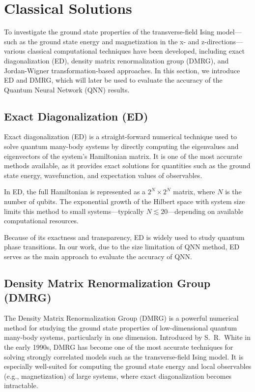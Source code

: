 \documentclass[pre,twocolumn,floatfix]{revtex4-1}
\begin{document}
\section{Classical Solutions}
To investigate the ground state properties of the transverse-field Ising model—such as the ground state energy and magnetization in the x- and z-directions—various classical computational techniques have been developed, including exact diagonalization (ED), density matrix renormalization group (DMRG), and Jordan-Wigner transformation-based approaches. In this section, we introduce ED and DMRG, which will later be used to evaluate the accuracy of the Quantum Neural Network (QNN) results. 
\subsection{Exact Diagonalization (ED)}
Exact diagonalization (ED) is a straight-forward numerical technique used to solve quantum many-body systems by directly computing the eigenvalues and eigenvectors of the system's Hamiltonian matrix. It is one of the most accurate methods available, as it provides exact solutions for quantities such as the ground state energy, wavefunction, and expectation values of observables.

In ED, the full Hamiltonian is represented as a $2^N \times 2^N$ matrix, where $N$ is the number of qubits. The exponential growth of the Hilbert space with system size limits this method to small systems---typically $N \lesssim 20$---depending on available computational resources.

Because of its exactness and transparency, ED is widely used to study quantum phase transitions. In our work, due to the size limitation of QNN method, ED serves as the main approach to evaluate the accuracy of QNN.


\subsection{Density Matrix Renormalization Group (DMRG)}
The Density Matrix Renormalization Group (DMRG) is a powerful numerical method for studying the ground state properties of low-dimensional quantum many-body systems, particularly in one dimension. Introduced by S.~R.~White in the early 1990s, DMRG has become one of the most accurate techniques for solving strongly correlated models such as the transverse-field Ising model. It is especially well-suited for computing the ground state energy and local observables (e.g., magnetization) of large systems, where exact diagonalization becomes intractable.
\end{document}

